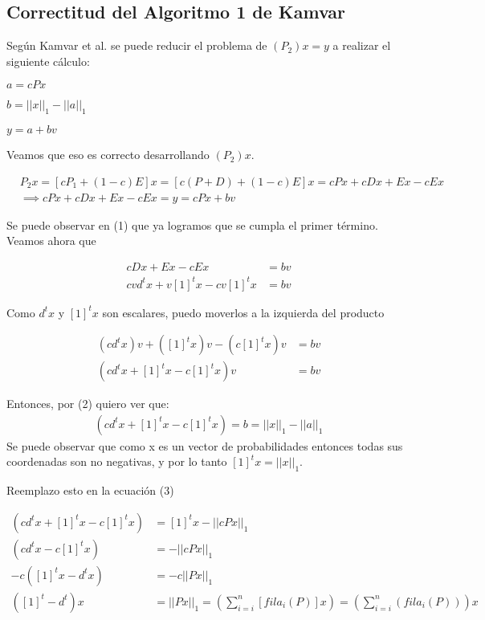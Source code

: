 \subsection{Correctitud del Algoritmo 1 de Kamvar} 
Seg\'un Kamvar et al. se puede reducir el problema de $(P_{2})x = y$ a realizar el siguiente c\'alculo:

	$a = cPx$

	$b = ||x||_{1} - ||a||_{1}$

	$y = a + bv$

Veamos que eso es correcto desarrollando $(P_{2})x$.

\begin{align}
	& P_{2}x = [cP_{1} + (1-c)E]x = [c(P + D) + (1-c)E]x = cPx + cDx + Ex -cEx \nonumber \\
	& \implies cPx + cDx + Ex -cEx = y= cPx +bv 
\end{align}

Se puede observar en (1) que ya logramos que se cumpla el primer t\'ermino. Veamos ahora que  

\begin{align*}
	cDx + Ex -cEx &= bv \\
	cvd^{t}x + v[1]^{t}x - cv[1]^{t}x &= bv
\end{align*}

Como $d^{t}x$ y $[1]^{t}x$ son escalares, puedo moverlos a la izquierda del producto

\begin{align}
	(cd^{t}x)v + ([1]^{t}x)v - (c[1]^{t}x)v &= bv \nonumber\\
	(cd^{t}x +[1]^{t}x - c[1]^{t}x)v &= bv
\end{align}

Entonces, por (2) quiero ver que:
\begin{align}
	(cd^{t}x +[1]^{t}x - c[1]^{t}x) = b = ||x||_{1} - ||a||_{1}
\end{align}
Se puede observar que como x es un vector de probabilidades entonces todas sus coordenadas son no negativas, y por lo tanto $[1]^{t}x = ||x||_{1}.$

Reemplazo esto en la ecuaci\'on (3)

\begin{align}
(cd^{t}x +[1]^{t}x - c[1]^{t}x) &= [1]^{t}x - ||cPx||_{1} \nonumber\\
(cd^{t}x-c[1]^{t}x) &= -||cPx||_{1} \nonumber\\
-c([1]^{t}x-d^{t}x) &= -c||Px||_{1} \nonumber\\
([1]^{t} -d^{t})x &= ||Px||_{1} = \left(\sum_{i=i}^{n}[fila_{i}(P)]x\right) = \left(\sum_{i=i}^{n}(fila_{i}(P))\right)x
\end{align}

